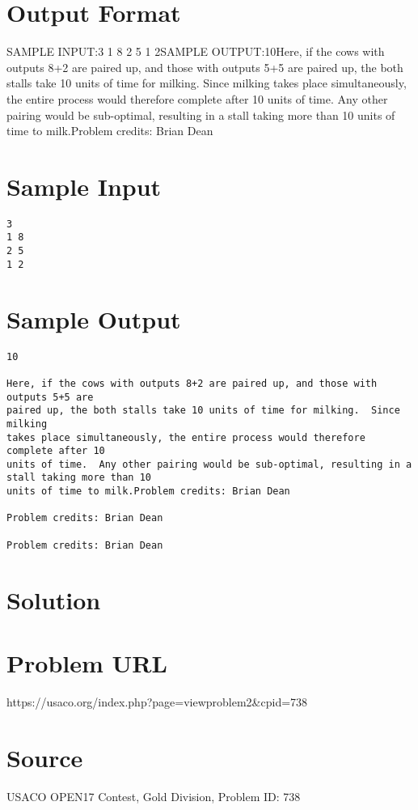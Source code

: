 \documentclass[12pt]{article}
\begin{document}
\section*{Output Format}
SAMPLE INPUT:3
1 8
2 5
1 2SAMPLE OUTPUT:10Here, if the cows with outputs 8+2 are paired up, and those with outputs 5+5 are
paired up, the both stalls take 10 units of time for milking.  Since milking
takes place simultaneously, the entire process would therefore complete after 10
units of time.  Any other pairing would be sub-optimal, resulting in a stall taking more than 10
units of time to milk.Problem credits: Brian Dean

\section*{Sample Input}
\begin{verbatim}
3
1 8
2 5
1 2
\end{verbatim}

\section*{Sample Output}
\begin{verbatim}
10

Here, if the cows with outputs 8+2 are paired up, and those with outputs 5+5 are
paired up, the both stalls take 10 units of time for milking.  Since milking
takes place simultaneously, the entire process would therefore complete after 10
units of time.  Any other pairing would be sub-optimal, resulting in a stall taking more than 10
units of time to milk.Problem credits: Brian Dean

Problem credits: Brian Dean

Problem credits: Brian Dean
\end{verbatim}

\section*{Solution}


\section*{Problem URL}
https://usaco.org/index.php?page=viewproblem2&cpid=738

\section*{Source}
USACO OPEN17 Contest, Gold Division, Problem ID: 738
\end{document}

